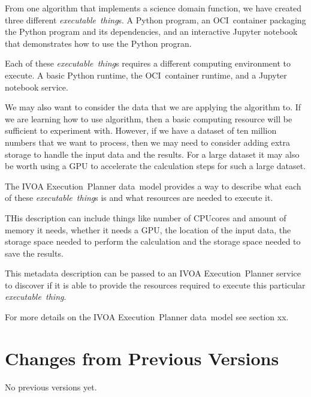 \documentclass[11pt,a4paper]{ivoa}
\newcommand{\datamodel} {data~model}
\newcommand{\ivoa} {IVOA}
\newcommand{\executionplanner} {Execution~Planner}
\newcommand{\jupyter} {Jupyter}
\newcommand{\python} {Python}
\newcommand{\ocicontainer} {OCI~container}
\newcommand{\dataset} {dataset}
\newcommand{\executablething}  {\textit{executable~thing}}
\newcommand{\cpu} {CPU}
\newcommand{\gpu} {GPU}
\begin{document}
From one algorithm that implements a science domain function, we have created three different \executablething{}s.
A \python{} program, an \ocicontainer{} packaging the \python{} program and its dependencies, and an interactive \jupyter{} notebook
that demonstrates how to use the \python{} progran.

Each of these \executablething{}s requires a different computing environment to execute.
A basic \python{} runtime, the \ocicontainer{} runtime, and a \jupyter{} notebook service.

We may also want to consider the data that we are applying the algorithm to.
If we are learning how to use algorithm, then a basic computing resource will be sufficient
to experiment with.
However, if we have a \dataset{} of ten million numbers that we want to process, then we may
need to consider adding extra storage to handle the input data and the results.
For a large \dataset{} it may also be worth using a \gpu{} to accelerate the calculation steps
for such a large \dataset{}.

The \ivoa{} \executionplanner{} \datamodel{} provides a way to describe what each of these \executablething{}s
is and what resources are needed to execute it.

THis description can include things like number of \cpu cores and amount of memory it needs,
whether it needs a \gpu{}, the location of the input data, the storage space needed to perform
the calculation and the storage space needed to save the results.

This metadata description can be passed to an \ivoa{} \executionplanner{} service to discover if it
is able to provide the resources required to execute this particular \executablething{}.

For more details on the \ivoa{} \executionplanner{} \datamodel{} see section xx.

\appendix
\section{Changes from Previous Versions}

No previous versions yet.



\end{document}
